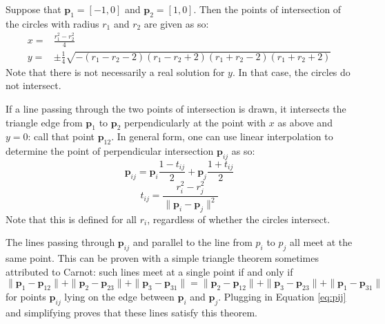 \documentclass{amsart}[12pt]
\begin{document}
Suppose that $\mathbf p_1 = [-1,0]$ and $\mathbf p_2 = [1,0]$. Then the points
of intersection of the circles with radius $r_1$ and $r_2$ are given as so:
\begin{equation}\begin{split}
x =& \frac{r^2_1 - r^2_2}{4}\\
y =& \pm \frac{1}{4} \sqrt{-
\left(r_1 - r_2 - 2\right)
\left(r_1 - r_2 + 2\right)
\left(r_1 + r_2 - 2\right)
\left(r_1 + r_2 + 2\right)}
\end{split}\end{equation}
Note that there is not necessarily a real solution for $y$. In that case, the
circles do not intersect.

If a line passing through the two points of intersection is drawn, it intersects
the triangle edge from $\mathbf p_1$ to $\mathbf p_2$ perpendicularly at
the point with $x$ as above and $y=0$: call that point $\mathbf p_{12}$. In
general form, one can use linear interpolation to determine the point of
perpendicular intersection $\mathbf p_{ij}$ as so:
\begin{equation}\label{eq:pij}
\mathbf p_{ij} = \mathbf p_i \frac{1-t_{ij}}{2} + \mathbf p_j \frac{1+t_{ij}}{2}
\end{equation}
\begin{equation}
t_{ij} = \frac{r_i^2 - r_j^2}{\| \mathbf p_i - \mathbf p_j \|^2}
\end{equation}
Note that this is defined for all $r_i$, regardless of whether the circles
intersect.

The lines passing through $\mathbf p_{ij}$ and parallel to the line from
$p_i$ to $p_j$ all meet at the same point. This can be proven with a simple
triangle theorem sometimes attributed to Carnot: such lines meet at a single
point if and only if \cite{posamentier}\cite{wohlgemuth}
\begin{equation}
  \|\mathbf p_1 - \mathbf p_{12}\| +
  \|\mathbf p_2 - \mathbf p_{23}\| +
  \|\mathbf p_3 - \mathbf p_{31}\| =
  \|\mathbf p_2 - \mathbf p_{12}\| +
  \|\mathbf p_3 - \mathbf p_{23}\| +
  \|\mathbf p_1 - \mathbf p_{31}\|
\end{equation}
for points $\mathbf p_{ij}$ lying on the edge between $\mathbf p_i$ and
$\mathbf p_j$. Plugging in Equation \ref{eq:pij} and simplifying proves that
these lines satisfy this theorem.
\end{document}
